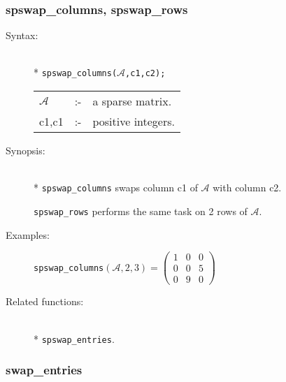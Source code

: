 \subsubsection{spswap\_columns, spswap\_rows}
\label{sparse:spswap_columns}
\hypertarget{operator:SPSWAP_COLUMNS}{}

\begin{description}
\item[Syntax:]\mbox{}\\*
\texttt{spswap\_columns($\mathcal{A}$,c1,c2);}\\[2mm]
\begin{tabular}{l l l}
$\mathcal{A}$ &:-& a sparse matrix. \\
c1,c1      &:-& positive integers.
\end{tabular}

\item[Synopsis:]\mbox{}\\*
\texttt{spswap\_columns} swaps column c1 of $\mathcal{A}$ with column c2.

\texttt{spswap\_rows} performs the same task on 2 rows of
                $\mathcal{A}$.

\item[Examples:]
\texttt{spswap\_columns}\((\mathcal{A},2,3) =
        \begin{pmatrix} 1 & 0 & 0 \\ 0 & 0 & 5 \\ 0 & 9 & 0 \end{pmatrix}\)

\item[Related functions:]\mbox{}\\*
\texttt{spswap\_entries}.
\end{description}

\subsubsection{swap\_entries}
\label{sparse:spadd_entries}
\hypertarget{operator:SPSWAP_ENTRIES}{}

